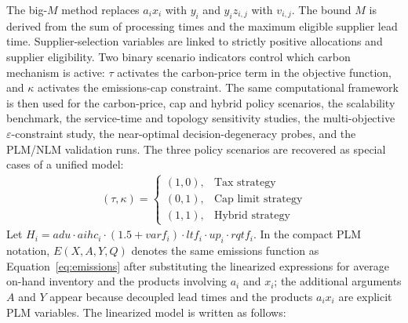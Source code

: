 \documentclass[preprint,12pt,authoryear]{elsarticle}
\begin{document}
The big-$M$ method replaces $a_i x_i$ with $y_i$ and $y_i z_{i,j}$ with $v_{i,j}$. The bound $M$ is derived from the sum of processing times and the maximum eligible supplier lead time. Supplier-selection variables are linked to strictly positive allocations and supplier eligibility. Two binary scenario indicators control which carbon mechanism is active: $\tau$ activates the carbon-price term in the objective function, and $\kappa$ activates the emissions-cap constraint. The same computational framework is then used for the carbon-price, cap and hybrid policy scenarios, the scalability benchmark, the service-time and topology sensitivity studies, the multi-objective $\varepsilon$-constraint study, the near-optimal decision-degeneracy probes, and the PLM/NLM validation runs. The three policy scenarios are recovered as special cases of a unified model:
\begin{gather}
    (\tau,\kappa)=
    \begin{cases}
      (1,0), & \text{Tax strategy}\\
      (0,1), & \text{Cap limit strategy}\\
      (1,1), & \text{Hybrid strategy}
    \end{cases}
\end{gather}
Let $H_i=adu\cdot aihc_i\cdot(1.5+varf_i)\cdot ltf_i\cdot up_i\cdot rqtf_i$. In the compact PLM notation, $E(X,A,Y,Q)$ denotes the same emissions function as Equation~\ref{eq:emissions} after substituting the linearized expressions for average on-hand inventory and the products involving $a_i$ and $x_i$; the additional arguments $A$ and $Y$ appear because decoupled lead times and the products $a_ix_i$ are explicit PLM variables. The linearized model is written as follows:
\end{document}
